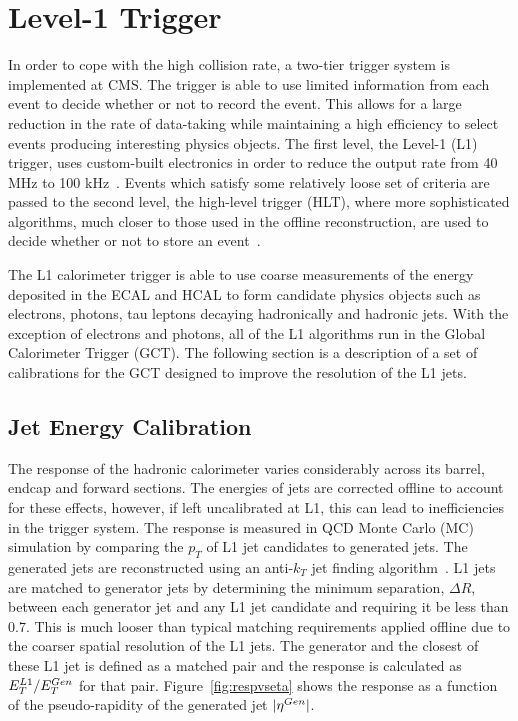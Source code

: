 \section{Level-1 Trigger}
\label{sec:l1trigger}

In order to cope with the high collision rate, a two-tier trigger
system is implemented at CMS. The trigger is able to use 
limited information from each event to decide whether or not
to record the event. This allows for a large reduction in the rate
of data-taking while maintaining a high efficiency to select events
producing interesting physics objects.
The first level, the Level-1 (L1) trigger, uses custom-built 
electronics in order to reduce the output rate from 40 MHz to 100 kHz~\citep{l1}.
Events which satisfy some relatively loose set of criteria are passed to 
the second level, the high-level trigger (HLT), where more sophisticated
algorithms, much closer to those used in the offline reconstruction,
are used to decide whether or not to store an event~\citep{hlt}.

The L1 calorimeter trigger is able to
use coarse measurements of the energy deposited in the ECAL and HCAL
to form candidate physics objects such as electrons, photons, tau leptons
decaying hadronically and hadronic jets. With the exception of 
electrons and photons, all of the L1 algorithms run in the Global Calorimeter
Trigger (GCT).  The following section is a description of 
a set of calibrations for the GCT designed to improve the resolution of 
the L1 jets.  

\subsection{Jet Energy Calibration}
\label{sec:jetenergyresponse}
The response of the hadronic calorimeter varies
considerably across its barrel, endcap and forward sections. 
The energies of jets are corrected offline to account for these effects,
however, if left uncalibrated at L1, this can lead to inefficiencies in the 
trigger system. The response is measured in QCD Monte Carlo (MC)
simulation by comparing the $p_{T}$ of L1 jet candidates to generated
jets. The generated jets are reconstructed using an anti-$k_{T}$ jet finding algorithm~\citep{antikt}. 
L1 jets are matched
to generator jets by determining the minimum separation, $\Delta R$, between 
each generator jet and any L1 jet candidate and requiring it be less than 0.7.
This is much looser than typical matching requirements applied offline due to the coarser
spatial resolution of the L1 jets.
The generator and the closest of these L1 jet is defined as a matched pair
and the response is calculated as $E_{T}^{L1}/E_{T}^{Gen}$ for that pair.
Figure~\ref{fig:respvseta} shows the response as a function of the pseudo-rapidity of the
generated jet $|\eta^{Gen}|$.

